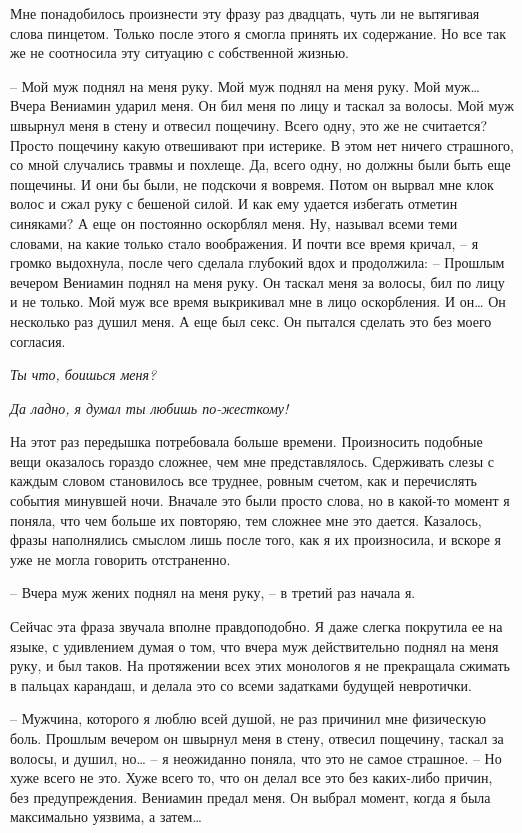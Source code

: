 \documentclass[
]{book}
\begin{document}
Мне понадобилось произнести эту фразу раз двадцать, чуть ли не вытягивая слова пинцетом. Только после этого я смогла принять их содержание. Но все так же не соотносила эту ситуацию с собственной жизнью.

-- Мой муж поднял на меня руку. Мой муж поднял на меня руку. Мой муж\ldots{} Вчера Вениамин ударил меня. Он бил меня по лицу и таскал за волосы. Мой муж швырнул меня в стену и отвесил пощечину. Всего одну, это же не считается? Просто пощечину какую отвешивают при истерике. В этом нет ничего страшного, со мной случались травмы и похлеще. Да, всего одну, но должны были быть еще пощечины. И они бы были, не подскочи я вовремя. Потом он вырвал мне клок волос и сжал руку с бешеной силой. И как ему удается избегать отметин синяками? А еще он постоянно оскорблял меня. Ну, называл всеми теми словами, на какие только стало воображения. И почти все время кричал, -- я громко выдохнула, после чего сделала глубокий вдох и продолжила: -- Прошлым вечером Вениамин поднял на меня руку. Он таскал меня за волосы, бил по лицу и не только. Мой муж все время выкрикивал мне в лицо оскорбления. И он\ldots{} Он несколько раз душил меня. А еще был секс. Он пытался сделать это без моего согласия.

\emph{Ты что, боишься меня?}

\emph{Да ладно, я думал ты любишь по-жесткому!}

На этот раз передышка потребовала больше времени. Произносить подобные вещи оказалось гораздо сложнее, чем мне представлялось. Сдерживать слезы с каждым словом становилось все труднее, ровным счетом, как и перечислять события минувшей ночи. Вначале это были просто слова, но в какой-то момент я поняла, что чем больше их повторяю, тем сложнее мне это дается. Казалось, фразы наполнялись смыслом лишь после того, как я их произносила, и вскоре я уже не могла говорить отстраненно.

-- Вчера муж жених поднял на меня руку, -- в третий раз начала я.

Сейчас эта фраза звучала вполне правдоподобно. Я даже слегка покрутила ее на языке, с удивлением думая о том, что вчера муж действительно поднял на меня руку, и был таков. На протяжении всех этих монологов я не прекращала сжимать в пальцах карандаш, и делала это со всеми задатками будущей невротички.

-- Мужчина, которого я люблю всей душой, не раз причинил мне физическую боль. Прошлым вечером он швырнул меня в стену, отвесил пощечину, таскал за волосы, и душил, но\ldots{} -- я неожиданно поняла, что это не самое страшное. -- Но хуже всего не это. Хуже всего то, что он делал все это без каких-либо причин, без предупреждения. Вениамин предал меня. Он выбрал момент, когда я была максимально уязвима, а затем\ldots{}
\end{document}
